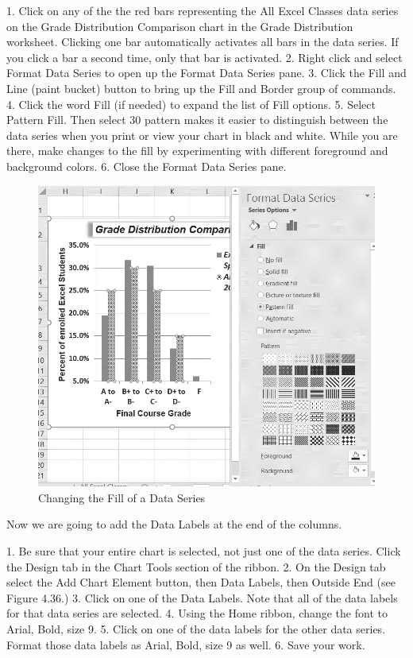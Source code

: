 1. Click on any of the the red bars representing the All Excel Classes data series on the Grade
Distribution Comparison chart in the Grade Distribution worksheet. Clicking one bar
automatically activates all bars in the data series. If you click a bar a second time, only that bar is
activated.
2. Right click and select Format Data Series to open up the Format Data Series pane.
3. Click the Fill and Line (paint bucket) button to bring up the Fill and Border group of
commands.
4. Click the word Fill (if needed) to expand the list of Fill options.
5. Select Pattern Fill. Then select 30%
pattern makes it easier to distinguish between the data series when you print or view your chart
in black and white. While you are there, make changes to the fill by experimenting with different
foreground and background colors.
6. Close the Format Data Series pane.



\begin{figure}[H]
	\centering
	\includegraphics[width=\maxwidth{.95\linewidth}]{gfx/ch04_fig38}
	\caption{Changing the Fill of a Data Series}
	\label{04:fig38}
\end{figure}

Now we are going to add the Data Labels at the end of the columns.

1. Be sure that your entire chart is selected, not just one of the data series. Click the Design tab in
the Chart Tools section of the ribbon.
2. On the Design tab select the Add Chart Element button, then Data Labels, then Outside
End (see Figure 4.36.)
3. Click on one of the Data Labels. Note that all of the data labels for that data series are selected.
4. Using the Home ribbon, change the font to Arial, Bold, size 9.
5. Click on one of the data labels for the other data series. Format those data labels as Arial, Bold,
size 9 as well.
6. Save your work.



